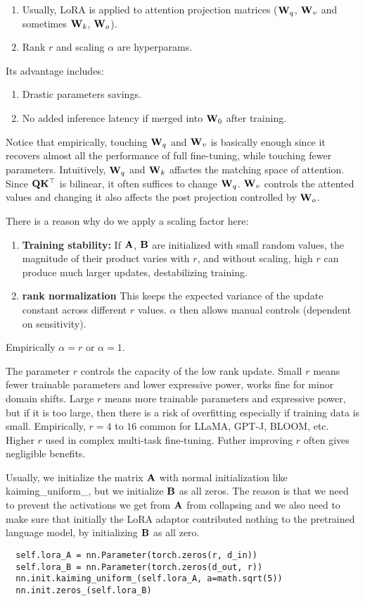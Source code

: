 \documentclass[11pt]{article}  %
\begin{document}
\begin{enumerate}
  \item Usually, LoRA is applied to attention projection matrices ($\mathbf{W}_q$, $\mathbf{W}_v$ and sometimes $\mathbf{W}_k$, $\mathbf{W}_o$).
  \item Rank $r$ and scaling $\alpha$ are hyperparams.
\end{enumerate}


Its advantage includes: 
\begin{enumerate}
  \item Drastic parameters savings.
  \item No added inference latency if merged into $\mathbf{W}_0$ after training.
\end{enumerate}

Notice that empirically, touching $\mathbf{W}_q$ and $\mathbf{W}_v$ is basically enough since it recovers almost all the performance of full fine-tuning, while touching fewer parameters.
Intuitively, $\mathbf{W}_q$ and $\mathbf{W}_k$ affactes the matching space of attention.
Since $\mathbf{Q}\mathbf{K}^{\top}$ is bilinear, it often suffices to change $\mathbf{W}_q$.  
$\mathbf{W}_v$ controls the attented values and changing it also affects the post projection controlled by $\mathbf{W}_o$.

There is a reason why do we apply a scaling factor here:
\begin{enumerate}
  \item \textbf{Training stability:} If $\mathbf{A}$, $\mathbf{B}$ are initialized with small random values, the magnitude of their product varies with $r$, and without scaling, high $r$ can produce much larger updates, destabilizing training. 
  \item \textbf{rank normalization} This keeps the expected variance of the update constant across different $r$ values. 
  $\alpha$ then allows manual controls (dependent on sensitivity).
\end{enumerate}
Empirically $\alpha = r$ or $\alpha = 1$.

The parameter $r$ controls the capacity of the low rank update.
Small $r$ means fewer trainable parameters and lower expressive power, works fine for minor domain shifts.
Large $r$ means more trainable parameters and expressive power, but if it is too large, then there is a risk of overfitting especially if training data is small. 
Empirically, $r = 4$ to $16$ common for LLaMA, GPT-J, BLOOM, etc.
Higher $r$ used in complex multi-task fine-tuning.
Futher improving $r$ often gives negligible benefits.

Usually, we initialize the matrix $\mathbf{A}$ with normal initialization like kaiming\_uniform\_, but we initialize $\mathbf{B}$ as all zeros.
The reason is that we need to prevent the activations we get from $\mathbf{A}$ from collapsing and we also need to make sure that initially the LoRA adaptor contributed nothing to the pretrained language model, by initializing $\mathbf{B}$ as all zero.
\begin{verbatim}
  self.lora_A = nn.Parameter(torch.zeros(r, d_in))
  self.lora_B = nn.Parameter(torch.zeros(d_out, r))
  nn.init.kaiming_uniform_(self.lora_A, a=math.sqrt(5))
  nn.init.zeros_(self.lora_B)
\end{verbatim}
\end{document}
